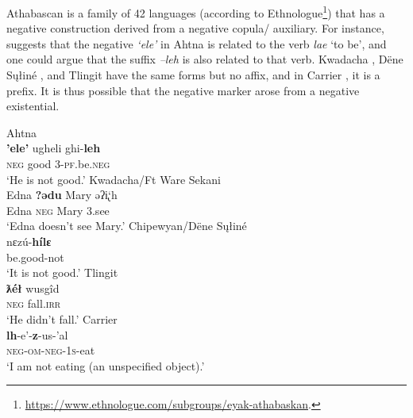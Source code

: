 ﻿\documentclass[output=paper]{langsci/langscibook}
\begin{document}
Athabascan is a family of 42 languages (according to Ethnologue\footnote{
\href{https://www.ethnologue.com/subgroups/eyak-athabaskan}{https://www.ethnologue.com/subgroups/eyak-athabaskan}.})
that has a negative construction derived from a negative copula\slash
auxiliary. For instance, \citet{Kari1990} suggests that the negative
\textit{`ele'} in Ahtna  is related to the verb
\textit{lae} `to be', and one could argue that the suffix \textit{–leh} is
also related to that verb.  Kwadacha , Dëne
S\k{u}łiné , and Tlingit
 have the same forms but no affix, and in
Carrier , it is a prefix. It is thus possible
that the negative marker arose from a negative existential.
%
\begin{exe}
    \ex Ahtna \label{ex:other-ahtna-good}\\
    \gll \textbf{{'ele'}}  ugheli  ghi-\textbf{leh} \\
\textsc{neg}  good  3-\textsc{pf}.be.\textsc{neg} \\
    \glt `He is not good.' \citep[272]{Kari1990}
    \ex Kwadacha\slash Ft Ware Sekani
    \label{ex:other-kwadacha-Edna}\\
    \gll Edna   \textbf{?ədu}  Mary  əʔi̢`h        \\
Edna  \textsc{neg}  Mary  3.see \\
    \glt `Edna doesn't see Mary.' \citep[110]{Hargus2002}
    \ex Chipewyan\slash Dëne S\k{u}łiné
    \label{ex:other-chipewyan-good}\\
    \gll nεzú-\textbf{hílε} \\
    be.good-not \\
    \glt `It is not good.' \citep[420]{Li1967}
    \ex Tlingit \label{ex:other-tlingit-fall}\\
    \gll \textbf{ƛéł}  wusgîd            \\
    \textsc{neg}  fall.\textsc{irr} \\
    \glt `He didn't fall.' \citep[72]{Krauss1969} 
    \ex     Carrier \label{ex:other-carrier-eat}\\
    \gll \textbf{lh}-e'-\textbf{z}-us-’al            \\
\textsc{neg-om-neg-1s}-eat \\
    \glt `I am not eating (an unspecified object).' \citep[26]{Poser2009}
    \end{exe}
\end{document}
